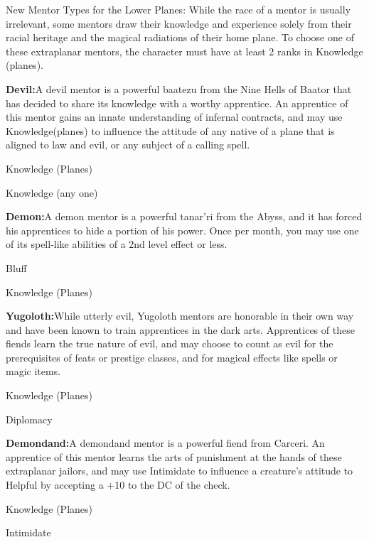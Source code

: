 {New Mentor Types for the Lower Planes:}
While the race of a mentor is usually irrelevant, some mentors draw their knowledge and experience solely from their racial heritage and the magical radiations of their home plane. To choose one of these extraplanar mentors, the character must have at least 2 ranks in Knowledge (planes).\vspace*{\baselineskip}

	\textbf{Devil:}{A devil mentor is a powerful baatezu from the Nine Hells of Baator that has decided to share its knowledge with a worthy apprentice. An apprentice of this mentor gains an innate understanding of infernal contracts, and may use Knowledge(planes) to influence the attitude of any native of a plane that is aligned to law and evil, or any subject of a calling spell.}

	\begin{itemize*}
		\item Knowledge (Planes)
		\item Knowledge (any one)
	\end{itemize*}

	\textbf{Demon:}{A demon mentor is a powerful tanar'ri from the Abyss, and it has forced his apprentices to hide a portion of his power. Once per month, you may use one of its spell-like abilities of a 2nd level effect or less.}

	\begin{itemize*}
		\item Bluff
		\item Knowledge (Planes)
	\end{itemize*}

	\textbf{Yugoloth:}{While utterly evil, Yugoloth mentors are honorable in their own way and have been known to train apprentices in the dark arts. Apprentices of these fiends learn the true nature of evil, and may choose to count as evil for the prerequisites of feats or prestige classes, and for magical effects like spells or magic items.}

	\begin{itemize*}
		\item Knowledge (Planes)
		\item Diplomacy
	\end{itemize*}

	\textbf{Demondand:}{A demondand mentor is a powerful fiend from Carceri. An apprentice of this mentor learns the arts of punishment at the hands of these extraplanar jailors, and may use Intimidate to influence a creature's attitude to Helpful by accepting a +10 to the DC of the check.}

	\begin{itemize*}
		\item Knowledge (Planes)
		\item Intimidate
	\end{itemize*}